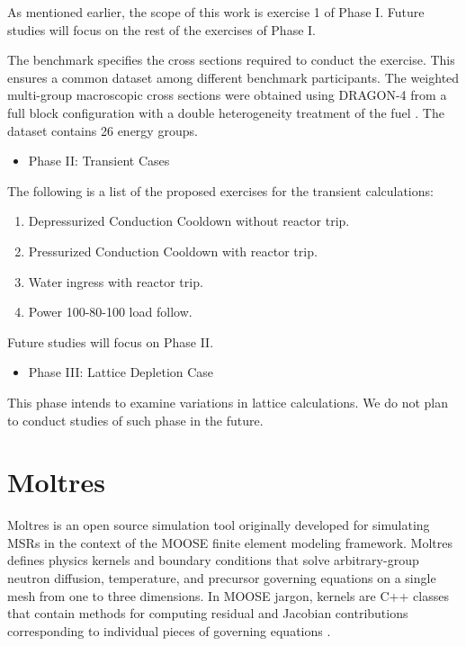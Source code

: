 \documentclass{anstrans}
\begin{document}
As mentioned earlier, the scope of this work is exercise 1 of Phase I.
Future studies will focus on the rest of the exercises of Phase I.

The benchmark specifies the cross sections required to conduct the exercise.
This ensures a common dataset among different benchmark participants.
The weighted multi-group macroscopic cross sections were obtained using DRAGON-4 \cite{marleau_user_2016}from a full block configuration with a double heterogeneity treatment of the fuel \cite{ortensi_prismatic_2011}.
The dataset contains 26 energy groups.

\begin{itemize}
	\item Phase II: Transient Cases
\end{itemize}

The following is a list of the proposed exercises for the transient calculations:

\begin{enumerate}
	\item Depressurized Conduction Cooldown without reactor trip.
	\item Pressurized Conduction Cooldown with reactor trip.
	\item Water ingress with reactor trip.
	\item Power 100-80-100 load follow.
\end{enumerate}

Future studies will focus on Phase II.

\begin{itemize}
	\item Phase III: Lattice Depletion Case
\end{itemize}

This phase intends to examine variations in lattice calculations.
We do not plan to conduct studies of such phase in the future.

\section{Moltres}

Moltres is an open source simulation tool originally developed for simulating \glspl{MSR} in the context of the \gls{MOOSE} finite element modeling framework.
Moltres defines physics kernels and boundary conditions that solve arbitrary-group neutron diffusion, temperature, and precursor governing equations on a single mesh from one to three dimensions.
In \gls{MOOSE} jargon, kernels are C++ classes that contain methods for computing residual and Jacobian contributions corresponding to individual pieces of governing equations \cite{lindsay_introduction_2018}.
\end{document}
